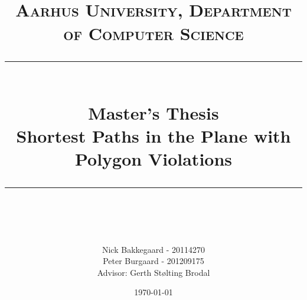 


\newcommand{\gerth}[1]{\todo[color=black!40]{#1}}
\newcommand{\nick}[1]{\todo[color=green!40]{#1}}
\newcommand{\peter}[1]{\todo[color=blue!40]{#1}}


\newcommand{\horrule}[1]{\rule{\linewidth}{#1}} %


\posttitle{
	\end{center}
}
\title{
	\\
	\normalfont \normalsize 
    \vspace{2cm}
	\textsc{Aarhus University, Department of Computer Science} \\ [25pt] %
	\horrule{0.5pt} \\[0.4cm] %
    \huge Master's Thesis \\
    \huge Shortest Paths in the Plane with Polygon Violations 
	\horrule{2pt} \\[0.5cm] %
}

\author{
	Nick Bakkegaard - 20114270\\
	Peter Burgaard - 201209175\\
	{\small Advisor: Gerth Stølting Brodal}
} %

\date{\normalsize\today} %



